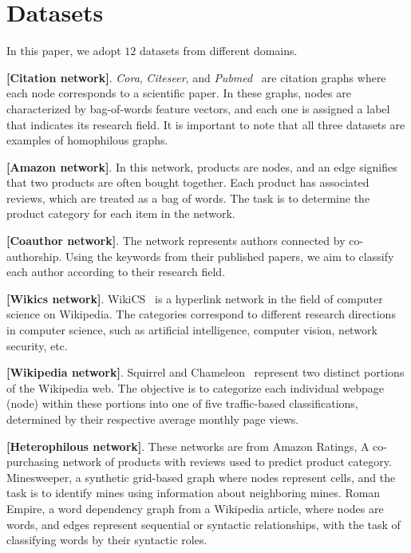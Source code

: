 \section{Datasets}

In this paper, we adopt $12$ datasets from different domains.

\noindent{\small$\bullet$} \textbf{[Citation network]}. \emph{Cora}, \emph{Citeseer}, and \emph{Pubmed}~\citep{Yang2016RevisitingSL} are citation graphs where each node corresponds to a scientific paper. In these graphs, nodes are characterized by bag-of-words feature vectors, and each one is assigned a label that indicates its research field. It is important to note that all three datasets are examples of homophilous graphs.

\noindent{\small$\bullet$} \textbf{[Amazon network]}. \citet{Shchur2018PitfallsOG} In this network, products are nodes, and an edge signifies that two products are often bought together.  Each product has associated reviews, which are treated as a bag of words.  The task is to determine the product category for each item in the network.

\noindent{\small$\bullet$} \textbf{[Coauthor network]}. \citet{Shchur2018PitfallsOG} The network represents authors connected by co-authorship.  Using the keywords from their published papers, we aim to classify each author according to their research field.

\noindent{\small$\bullet$} \textbf{[Wikics network]}. WikiCS~\citep{mernyei2020wiki} is a hyperlink network in the field of computer science on Wikipedia. The categories correspond to different research directions in computer science, such as artificial intelligence, computer vision, network security, etc.


\noindent{\small$\bullet$} \textbf{[Wikipedia network]}.  Squirrel and Chameleon~\citep{platonov2023a} represent two distinct portions of the Wikipedia web.  The objective is to categorize each individual webpage (node) within these portions into one of five traffic-based classifications, determined by their respective average monthly page views.

\noindent{\small$\bullet$} \textbf{[Heterophilous network]}. These networks are from \citet{platonov2023a} Amazon Ratings, A co-purchasing network of products with reviews used to predict product category. Minesweeper, a synthetic grid-based graph where nodes represent cells, and the task is to identify mines using information about neighboring mines. Roman Empire, a word dependency graph from a Wikipedia article, where nodes are words, and edges represent sequential or syntactic relationships, with the task of classifying words by their syntactic roles.

